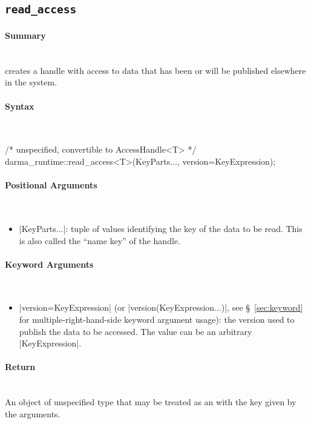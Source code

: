 \subsection{\texttt{read\_access}}
\label{ssec:api_fe_read_access}

\paragraph{Summary}\mbox{}\\
 creates a \gls{handle} with  access to data that has been or will be
published elsewhere in the system.


\paragraph{Syntax}\mbox{}\\
\begin{CppCode}
/* unspecified, convertible to AccessHandle<T> */
darma_runtime::read_access<T>(KeyParts..., version=KeyExpression);
\end{CppCode}


\paragraph{Positional Arguments}\mbox{}\\
\begin{itemize}
  \item |KeyParts...|: tuple of values identifying the key of the data to
  be read.  This is also called the ``name key'' of the handle.
\end{itemize}

\paragraph{Keyword Arguments}\mbox{}\\
\begin{itemize}
  \item |version=KeyExpression| (or |version(KeyExpression...)|,
see \S~\ref{sec:keyword} for multiple-right-hand-side keyword argument usage):
the version used to publish the data to be accessed.
The value can be an arbitrary |KeyExpression|.
\end{itemize}


\paragraph{Return}\mbox{}\\
An object of unspecified type that may be treated as an 
with the key given by the arguments.

